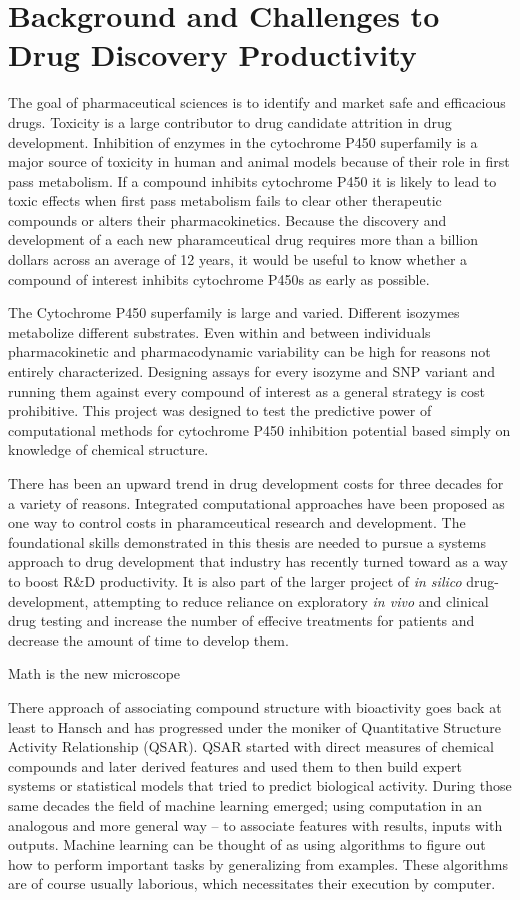 
\section{Background and Challenges to Drug Discovery Productivity}
The goal of pharmaceutical sciences is to identify and market safe and efficacious drugs. Toxicity is a large contributor to drug candidate attrition in drug development. Inhibition of enzymes in the cytochrome P450 superfamily is a major source of toxicity in human and animal models because of their role in first pass metabolism. If a compound inhibits cytochrome P450 it is likely to lead to toxic effects when first pass metabolism fails to clear other therapeutic compounds or alters their pharmacokinetics. Because the discovery and development of a each new pharamceutical drug requires more than a billion dollars across an average of 12 years, it would be useful to know whether a compound of interest inhibits cytochrome P450s as early as possible.

The Cytochrome P450 superfamily is large and varied. Different isozymes metabolize different substrates. Even within and between individuals pharmacokinetic and pharmacodynamic variability can be high for reasons not entirely characterized. Designing assays for every isozyme and SNP variant and running them against every compound of interest as a general strategy is cost prohibitive. This project was designed to test the predictive power of computational methods for cytochrome P450 inhibition potential based simply on knowledge of chemical structure.

There has been an upward trend in drug development costs for three decades for a variety of reasons. Integrated computational approaches have been proposed as one way to control costs in pharamceutical research and development. The foundational skills demonstrated in this thesis are needed to pursue a systems approach to drug development that industry has recently turned toward as a way to boost R\&D productivity. \cite{Visser2014,Berg2014} It is also part of the larger project of \textit{in silico} drug-development, attempting to reduce reliance on exploratory \textit{in vivo} and clinical drug testing and increase the number of effecive treatments for patients and decrease the amount of time to develop them.

Math is the new microscope \cite{Cohen2004}

There approach of associating compound structure with bioactivity goes back at least to Hansch \cite{Hansch1964} and has progressed under the moniker of Quantitative Structure Activity Relationship (QSAR). QSAR started with direct measures of chemical compounds and later derived features and used them to then build expert systems or statistical models that tried to predict biological activity. During those same decades the field of machine learning emerged; using computation in an analogous and more general way -- to associate features with results, inputs with outputs. Machine learning can be thought of as using algorithms to figure out how to perform important tasks by generalizing from examples. These algorithms are of course usually laborious, which necessitates their execution by computer.

